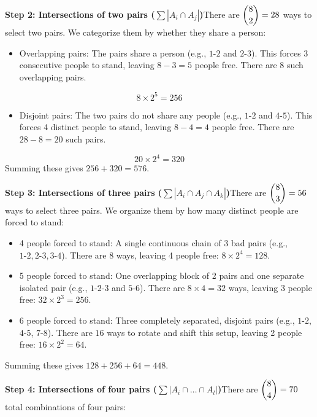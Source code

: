 \begin{enumerate}
 \textbf{Step 2: Intersections of two pairs ($\sum |A_i \cap A_j|$)}There are $\dbinom{8}{2} = 28$ ways to select two pairs. We categorize them by whether they share a person:

 
            \begin{itemize}
        \item Overlapping pairs: The pairs share a person (e.g., $1\text{-}2$ and $2\text{-}3$). This forces 3 consecutive people to stand, leaving $8 - 3 = 5$ people free. There are $8$ such overlapping pairs.
            \end{itemize}
            
 \[8 \times 2^5 = 256\]

            \begin{itemize}
        \item Disjoint pairs: The two pairs do not share any people (e.g., $1\text{-}2$ and $4\text{-}5$). This forces 4 distinct people to stand, leaving $8 - 4 = 4$ people free. There are $28 - 8 = 20$ such pairs.
            \end{itemize}
            
 \[20 \times 2^4 = 320\]Summing these gives $256 + 320 = 576$.

 \textbf{Step 3: Intersections of three pairs ($\sum |A_i \cap A_j \cap A_k|$)}There are $\dbinom{8}{3} = 56$ ways to select three pairs. We organize them by how many distinct people are forced to stand:

 
            \begin{itemize}
        \item 4 people forced to stand: A single continuous chain of 3 bad pairs (e.g., $1\text{-}2, 2\text{-}3, 3\text{-}4$). There are $8$ ways, leaving 4 people free: $8 \times 2^4 = 128$.
        \item 5 people forced to stand: One overlapping block of 2 pairs and one separate isolated pair (e.g., $1\text{-}2\text{-}3$ and $5\text{-}6$). There are $8 \times 4 = 32$ ways, leaving 3 people free: $32 \times 2^3 = 256$.
        \item 6 people forced to stand: Three completely separated, disjoint pairs (e.g., $1\text{-}2$, $4\text{-}5$, $7\text{-}8$). There are $16$ ways to rotate and shift this setup, leaving 2 people free: $16 \times 2^2 = 64$.
            \end{itemize}
            Summing these gives $128 + 256 + 64 = 448$.

 \textbf{Step 4: Intersections of four pairs ($\sum |A_i \cap \dots \cap A_l|$)}There are $\dbinom{8}{4} = 70$ total combinations of four pairs:


\end{enumerate}
